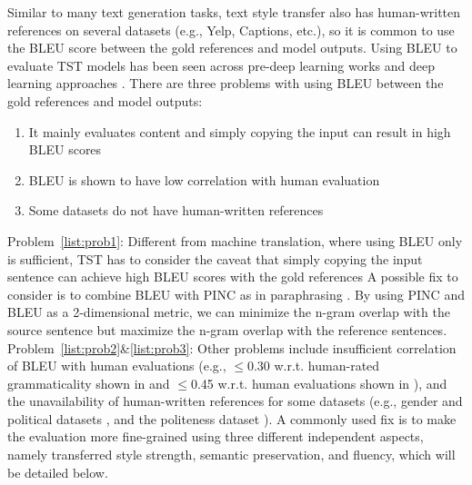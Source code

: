 Similar to many text generation tasks, text style transfer also has human-written references on several datasets (e.g., Yelp, Captions, etc.), so it is common to use the BLEU score  between the gold references and model outputs. Using BLEU to evaluate TST models has been seen across pre-deep learning works  and deep learning approaches .
There are three problems with using BLEU between the gold references and model outputs:
\begin{enumerate}[align=left, 
leftmargin=*,
label=Problem \arabic*), ref= \arabic*]
    \item It mainly evaluates content and simply copying the input can result in high BLEU scores \label{list:prob1}
    \item BLEU is shown to have low correlation with human evaluation \label{list:prob2}
    \item Some datasets do not have human-written references \label{list:prob3} 
\end{enumerate}
Problem~\ref{list:prob1}: Different from machine translation, where using BLEU only is sufficient, TST has to consider the caveat that simply copying the input sentence can achieve high BLEU scores with the gold references  
A possible fix to consider is to combine BLEU with PINC  as in paraphrasing . By using PINC and BLEU as a 2-dimensional metric, we can minimize the n-gram overlap with the source sentence but maximize the n-gram overlap with the reference sentences.
Problem~\ref{list:prob2}\&\ref{list:prob3}: Other problems include insufficient correlation of BLEU with human evaluations (e.g., $\leq$0.30 w.r.t. human-rated grammaticality shown in  and $\leq$0.45 w.r.t. human evaluations shown in ), and the unavailability of human-written references for some datasets (e.g., gender and political datasets , and the politeness dataset ). A commonly used fix is to make the evaluation more fine-grained using three different independent aspects, namely transferred style strength, semantic preservation, and fluency, which will be detailed below.

